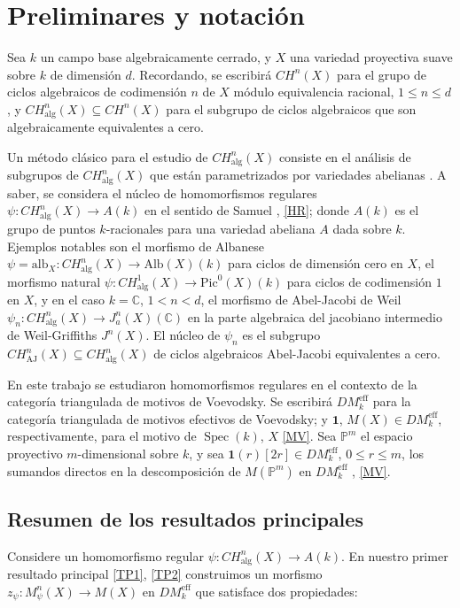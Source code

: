 \documentclass[10pt]{amsart}
\theoremstyle{definition}
\theoremstyle{remark}
\theoremstyle{definition}
\begin{document}
\newpage
\section{Preliminares y notación}
Sea \(k\) un campo base algebraicamente cerrado, y \(X\) una variedad proyectiva suave sobre \(k\) de dimensión \(d\). Recordando, se escribirá  \(CH^{n}(X)\) para el grupo de ciclos algebraicos de codimensión \(n\) de \(X\) módulo equivalencia racional, \(1\leq n\leq d\), y \(CH^{n}_{\mathrm{alg}}(X)\subseteq CH^{n}(X)\) para el subgrupo de ciclos algebraicos que son algebraicamente equivalentes a cero.





Un método clásico para el estudio de \(CH^{n}_{\mathrm{alg}}(X)\) consiste en el análisis de subgrupos de \(CH^{n}_{\mathrm{alg}}(X)\) que están parametrizados por variedades abelianas \cite[pp. 445-446]{Kle71}. A saber, se considera el núcleo de homomorfismos regulares \(\psi:CH^{n}_{\mathrm{alg}}(X)\to A(k)\) en el sentido de Samuel \cite[p. 477]{Sam60}, \ref{HR}; donde \(A(k)\) es el grupo de puntos \(k\)-racionales para una variedad abeliana \(A\) dada sobre \(k\). Ejemplos notables son el morfismo de Albanese \(\psi=\mathrm{alb}_{X}:CH^{n}_{\mathrm{alg}}(X)\to\mathrm{Alb}(X)(k)\) para ciclos de dimensión cero en \(X\), el morfismo natural \(\psi:CH^{1}_{\mathrm{alg}}(X)\to\mathrm{Pic}^{0}(X)(k)\) para ciclos de codimensión \(1\) en \(X\), y en el caso \(k=\mathbb{C}\), \(1<n<d\), el morfismo de Abel-Jacobi de Weil \(\psi_{n}:CH^{n}_{\mathrm{alg}}(X)\to J^{n}_{a}(X)(\mathbb{C})\) en la parte algebraica del jacobiano intermedio de Weil-Griffiths \(J^{n}(X)\). El núcleo de \(\psi_{n}\) es el subgrupo \(CH^{n}_{\mathrm{AJ}}(X)\subseteq CH^{n}_{\mathrm{alg}}(X)\) de ciclos algebraicos Abel-Jacobi equivalentes a cero.


En este trabajo se estudiaron homomorfismos regulares en el contexto de la categoría triangulada de motivos de Voevodsky. Se escribirá \(DM^{\mathrm{eff}}_{k}\) para la categoría triangulada de motivos efectivos de Voevodsky; y \(\mathbf{1}\), \(M(X)\in DM^{\mathrm{eff}}_{k}\), respectivamente, para el motivo de \(\operatorname{Spec}(k)\), \(X\) \ref{MV}. Sea \(\mathbb{P}^{m}\) el espacio proyectivo \(m\)-dimensional sobre \(k\), y sea \(\mathbf{1}(r)[2r]\in DM^{\mathrm{eff}}_{k}\), \(0\leq r\leq m\), los sumandos directos en la descomposición de \(M(\mathbb{P}^{m})\) en \(DM^{\mathrm{eff}}_{k}\) \cite[Prop. 3.5.1]{Voe00b}, \ref{MV}.

\subsection{Resumen de los resultados principales}
Considere un homomorfismo regular $\psi:CH^{n}_{\mathrm{alg}}(X)\to A(k)$. En nuestro primer resultado principal \ref{TP1}, \ref{TP2} construimos un morfismo $z_{\psi}:M^{n}_{\psi}(X)\to M(X)$ en $DM^{\mathrm{eff}}_{k}$ que satisface dos propiedades:
\end{document}
